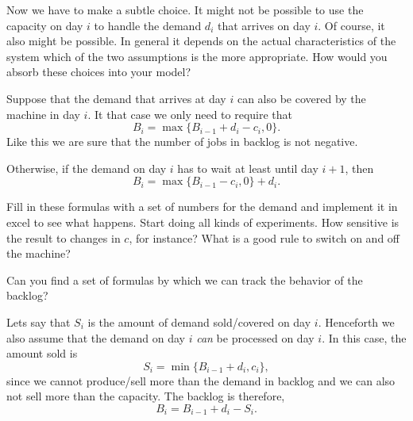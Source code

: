 \begin{question}
  Now we have to make a subtle choice. It might not be possible to use
  the capacity on day $i$ to handle the demand $d_i$ that arrives on
  day $i$. Of course, it also might be possible. In general it depends
  on the actual characteristics of the system which of the two
  assumptions is the more appropriate.  How would you absorb these
  choices into your model?
  \begin{solution}
    Suppose that the demand that arrives at day $i$ can also be covered by the machine in day $i$. It that case we only need to require that 
    \begin{equation*}
    B_i = \max\{B_{i-1} + d_i - c_i, 0\}.
    \end{equation*}
    Like this we are sure that the number of jobs in backlog is not
    negative.  

Otherwise, if the demand on day $i$ has to wait at least until day $i+1$, then
    \begin{equation*}
    B_i = \max\{B_{i-1} - c_i, 0\} + d_i.
    \end{equation*}

    Fill in these formulas with a set of numbers for the demand and
    implement it in excel to see what happens.  Start doing all kinds
    of experiments. How sensitive is the result to changes in $c$, for
    instance? What is a good rule to switch on and off the machine?
  \end{solution}
\end{question}

 


\begin{question}
  Can you find a set of formulas by which we can track the behavior of the backlog? 
  \begin{solution}
    Lets say that $S_i$ is the amount of demand sold/covered on day $i$. Henceforth we also assume that the demand on day $i$ \emph{can} be processed on day $i$. In this case, the amount sold is 
    \begin{equation*}
      S_i = \min\{B_{i-1}+d_i, c_i\},
    \end{equation*}
    since we cannot produce/sell more than the demand in backlog and
    we can also not sell more than the capacity.  The backlog is therefore,
\begin{equation*}
  B_i = B_{i-1}+d_i - S_i.
\end{equation*}
  \end{solution}
\end{question}

